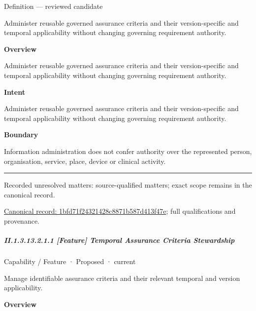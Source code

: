 Definition — reviewed candidate



Administer reusable governed assurance criteria and their version-specific and temporal applicability without changing governing requirement authority.



\textbf{Overview}



Administer reusable governed assurance criteria and their version-specific and temporal applicability without changing governing requirement authority.



\textbf{Intent}



Administer reusable governed assurance criteria and their version-specific and temporal applicability without changing governing requirement authority.



\textbf{Boundary}



Information administration does not confer authority over the represented person, organisation, service, place, device or clinical activity.



\medskip\hrule\medskip

{\small Recorded unresolved matters: source-qualified matters; exact scope remains in the canonical record.}\par
{\footnotesize \href{../../../../continuum/strategy/capability/1bfd71f24321428c8871b587d413f47e.md}{Canonical record: 1bfd71f24321428c8871b587d413f47e}; full qualifications and provenance.}\par
\subparagraph*{II.1.3.13.2.1.1 [Feature] Temporal Assurance Criteria Stewardship}
\label{navigation:II.1.3.13.2.1.1}

\label{element:e345a4b1eef846a7b77568f519e2c75c}
{\small Capability / Feature · Proposed · current}\par

Manage identifiable assurance criteria and their relevant temporal and version applicability.



\textbf{Overview}



